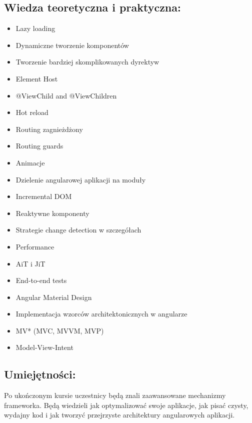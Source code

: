 \documentclass{article}[10pt]
\begin{document}
	\subsection*{Wiedza teoretyczna i praktyczna:}
\begin{adjustwidth}{1.5cm}{}
	\begin{itemize}
		\item Lazy loading
		\item Dynamiczne tworzenie komponentów
		\item Tworzenie bardziej skomplikowanych dyrektyw
		\item Element Host
		\item @ViewChild and @ViewChildren
		\item Hot reload
		\item Routing zagnieżdżony
		\item Routing guards
		\item Animacje
		\item Dzielenie angularowej aplikacji na moduły
		\item Incremental DOM
		\item Reaktywne komponenty
		\item Strategie change detection w szczegółach
		\item Performance
		\item AiT i JiT
		\item End-to-end tests
		\item Angular Material Design
		\item Implementacja wzorców architektonicznych w angularze
		\item MV* (MVC, MVVM, MVP)
		\item Model-View-Intent
	\end{itemize}
\end{adjustwidth}

	\subsection*{Umiejętności:}
\begin{adjustwidth}{2cm}{}
\justifying
	
Po ukończonym kursie uczestnicy będą znali zaawansowane mechanizmy frameworka. Będą wiedzieli jak optymalizować swoje aplikacje, jak pisać czysty, wydajny kod i jak tworzyć przejrzyste architektury angularowych aplikacji.



\end{adjustwidth}
\end{document}
